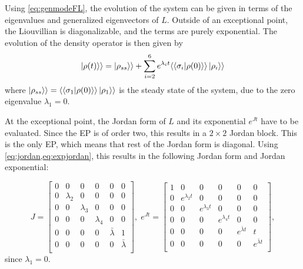 \documentclass[../main.tex]{subfiles}
\begin{document}
Using \cref{eq:genmodeFL}, the evolution of the system can be given in terms of the eigenvalues and generalized eigenvectors of $L$. Outside of an exceptional point, the Liouvillian is diagonalizable, and the terms are purely exponential. The evolution of the density operator is then given by
\begin{equation}\label{eq:dynnonep}
    \ket{\rho(t)}\rangle = \ket{\rho_{ss}}\rangle + \sum_{i=2}^6 e^{\lambda_i t} \langle\braket{\sigma_i|\rho(0)}\rangle \ket{\rho_i}\rangle
\end{equation}
where $\ket{\rho_{ss}}\rangle = \langle\braket{\sigma_1|\rho(0)}\rangle \ket{\rho_1}\rangle$ is the steady state of the system, due to the zero eigenvalue $\lambda_1=0$.

At the exceptional point, the Jordan form of $L$ and its exponential $e^{Jt}$ have to be evaluated. Since the EP is of order two, this results in a $2\times2$ Jordan block. This is the only EP, which means that rest of the Jordan form is diagonal. Using \cref{eq:jordan,eq:expjordan}, this results in the following Jordan form and Jordan exponential:

\begin{equation}
    J = \begin{bmatrix} 0 & 0 & 0 & 0 & 0 & 0 \\
                        0 & \lambda_2 & 0 & 0 & 0 & 0 \\
                        0 & 0 & \lambda_3 & 0 & 0 & 0 \\
                        0 & 0 & 0 & \lambda_4 & 0 & 0 \\
                        0 & 0 & 0 & 0 & \bar \lambda & 1 \\
                        0 & 0 & 0 & 0 & 0 & \bar \lambda \\ \end{bmatrix}, \; 
        e^{Jt} = \begin{bmatrix} 1 & 0 & 0 & 0 & 0 & 0 \\
            0 & e^{\lambda_2t} & 0 & 0 & 0 & 0 \\
            0 & 0 & e^{\lambda_3t} & 0 & 0 & 0 \\
            0 & 0 & 0 & e^{\lambda_4t} & 0 & 0 \\
            0 & 0 & 0 & 0 & e^{\bar \lambda t} & t \\
        0 & 0 & 0 & 0 & 0 & e^{\bar \lambda t} \\ \end{bmatrix},
\end{equation}
since $\lambda_1 = 0$.
\end{document}
